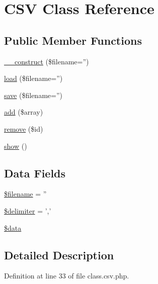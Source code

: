 \hypertarget{class_c_s_v}{\section{C\-S\-V Class Reference}
\label{class_c_s_v}
}
\subsection*{Public Member Functions}
\begin{DoxyCompactItemize}
\item 
\hyperlink{class_c_s_v_a14c84bb63122ad8fcb01df17afd63a1f}{\-\_\-\-\_\-construct} (\$filename='')
\item 
\hyperlink{class_c_s_v_ac3e60980a993f765445acea4e30bed73}{load} (\$filename='')
\item 
\hyperlink{class_c_s_v_a3a876f7e0ace40b48d9369e4855c498d}{save} (\$filename='')
\item 
\hyperlink{class_c_s_v_aa4de84fb89ac3c97fbaf4ad312bb47eb}{add} (\$array)
\item 
\hyperlink{class_c_s_v_a11f0aa9afc724ac4074e3ca127e79a2a}{remove} (\$id)
\item 
\hyperlink{class_c_s_v_a2b8e3779f5bd8c38f70307574859bd36}{show} ()
\end{DoxyCompactItemize}
\subsection*{Data Fields}
\begin{DoxyCompactItemize}
\item 
\hyperlink{class_c_s_v_a0722441477f957078ee2437054556cbc}{\$filename} = ''
\item 
\hyperlink{class_c_s_v_a40acc7b8c08cfbb456cd9444cb0e8f61}{\$delimiter} = ','
\item 
\hyperlink{class_c_s_v_a6efc15b5a2314dd4b5aaa556a375c6d6}{\$data}
\end{DoxyCompactItemize}


\subsection{Detailed Description}


Definition at line 33 of file class.\-csv.\-php.



